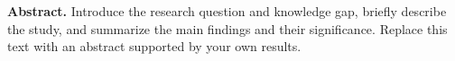 \textbf{Abstract.} Introduce the research question and knowledge gap, briefly
describe the study, and summarize the main findings and their significance.
Replace this text with an abstract supported by your own results.
